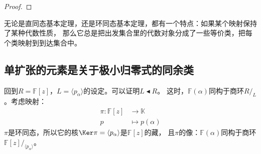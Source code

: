 \documentclass[12pt,UTF8]{ctexbook}
\begin{document}
\begin{appendix}
\begin{proof}
\end{proof}


无论是直同态基本定理，还是环同态基本定理，都有一个特点：如果某个映射保持了某种代数性质，
那么它总是把出发集合里的代数对象分成了一些等价类，把每个类映射到到达集合中。

\subsection{单扩张的元素是关于极小归零式的同余类}
回到$R = \mathbb{F}[z]$，$L = \langle p_\alpha \rangle$的设定。可以证明$L \blacktriangleleft R$。
这时，$\mathbb{F}(\alpha)$同构于商环$R/_L$。考虑映射：
\begin{align*}
    \pi : \mathbb{F}[z] &\rightarrow \mathbb{K}  \\
    p &\mapsto p(\alpha)  
\end{align*}
$\pi$是环同态，所以它的核$\Ker\pi = \langle p_\alpha \rangle$是$\mathbb{F}[z]$的藏，
且$\pi$的像：$\mathbb{F}(\alpha)$同构于商环$\mathbb{F}[z] /_{\langle p_\alpha \rangle}$。


\end{appendix}
\end{document}
